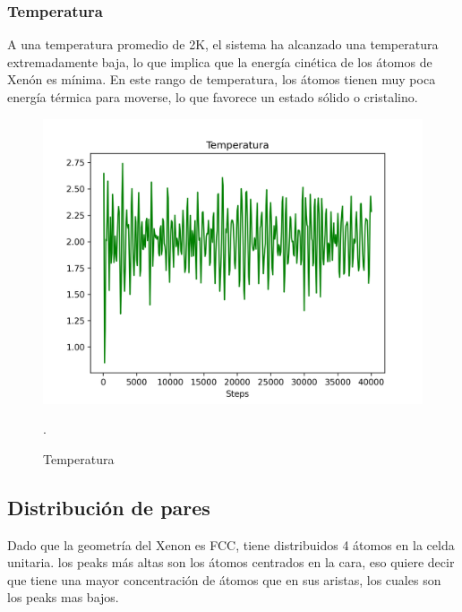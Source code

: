 \documentclass[10pt,letterpaper,twocolumn]{article}
\begin{document}
\subsubsection*{Temperatura}

A una temperatura promedio de 2K, el sistema ha alcanzado una temperatura extremadamente baja, 
lo que implica que la energía cinética de los átomos de Xenón es mínima. En este rango de 
temperatura, los átomos tienen muy poca energía térmica para moverse, lo que favorece un 
estado sólido o cristalino.

\begin{figure}[h]
	\centering
	\includegraphics[scale=0.50]{temperatura (3).png}
	\caption{Temperatura}.
\end{figure}

\subsection*{Distribución de pares}

Dado que la geometría del Xenon es FCC, tiene distribuidos 4 átomos en la celda 
unitaria. los peaks más altas son los átomos centrados en la cara, eso quiere decir 
que tiene una mayor concentración de átomos que en sus aristas, los cuales son los 
peaks mas bajos. 
\end{document}
